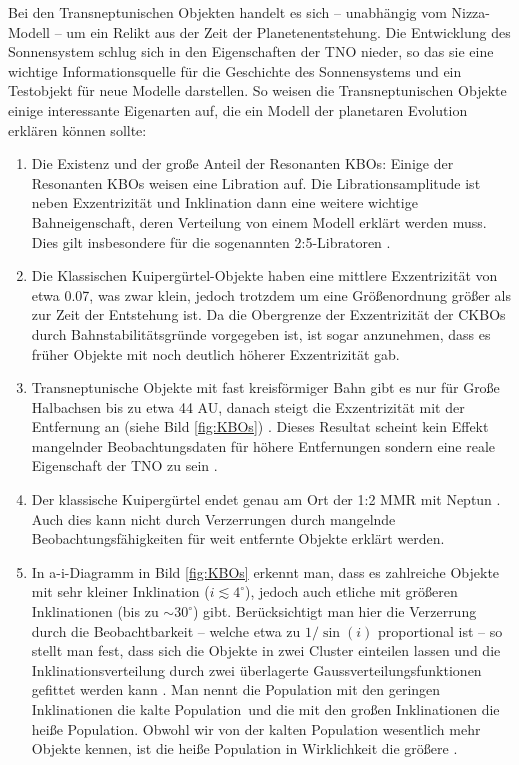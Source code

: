 \documentclass[12pt,a4paper,twoside,open=right,bibliography=totoc]{scrbook}
\renewcommand{\cite}{ \citep}
\begin{document}
\noindent
Bei den Transneptunischen Objekten handelt es sich -- unabhängig vom Nizza-Modell -- um ein Relikt aus der Zeit der Planetenentstehung. Die Entwicklung des Sonnensystem schlug sich in den Eigenschaften der TNO nieder, so das sie eine wichtige Informationsquelle für die Geschichte des Sonnensystems und ein Testobjekt für neue Modelle darstellen.
So weisen die Transneptunischen Objekte einige interessante Eigenarten auf, die ein Modell der planetaren Evolution erklären können sollte:
\begin{enumerate}
\item Die Existenz und der große Anteil der Resonanten KBOs: Einige der Resonanten KBOs weisen eine Libration auf. Die Librationsamplitude ist neben Exzentrizität und Inklination dann eine weitere wichtige Bahneigenschaft, deren Verteilung von einem Modell erklärt werden muss. Dies gilt insbesondere für die sogenannten 2:5-Libratoren\cite{Levison2008}.
\item Die Klassischen Kuipergürtel-Objekte haben eine mittlere Exzentrizität von etwa 0.07, was zwar klein, jedoch trotzdem um eine Größenordnung größer als zur Zeit der Entstehung ist. Da die Obergrenze der Exzentrizität der CKBOs durch Bahnstabilitätsgründe vorgegeben ist, ist sogar anzunehmen, dass es früher Objekte mit noch deutlich höherer Exzentrizität gab.
\item Transneptunische Objekte mit fast kreisförmiger Bahn gibt es nur für Große Halbachsen bis zu etwa 44 AU, danach steigt die Exzentrizität mit der Entfernung an (siehe Bild \ref{fig:KBOs})\cite{Levison2008}. Dieses Resultat scheint kein Effekt mangelnder Beobachtungsdaten für höhere Entfernungen sondern eine reale Eigenschaft der TNO zu sein\cite{Levison2008}.
\item Der klassische Kuipergürtel endet genau am Ort der 1:2 MMR mit Neptun\cite{Levison2008}. Auch dies kann nicht durch Verzerrungen durch mangelnde Beobachtungsfähigkeiten für weit entfernte Objekte erklärt werden.
\item In a-i-Diagramm in Bild \ref{fig:KBOs} erkennt man, dass es zahlreiche Objekte mit sehr kleiner Inklination ($i\lesssim 4^\circ$), jedoch auch etliche mit größeren Inklinationen (bis zu $\sim 30^\circ$) gibt. Berücksichtigt man hier die Verzerrung durch die Beobachtbarkeit -- welche etwa zu $1/\sin(i)$ proportional ist -- so stellt man fest, dass sich die Objekte in zwei Cluster einteilen lassen und die Inklinationsverteilung durch zwei überlagerte Gaussverteilungsfunktionen gefittet werden kann\cite{Brown2001,Levison2008}.
Man nennt die Population mit den geringen Inklinationen die \glqq kalte Population\grqq\ und die mit den großen Inklinationen die \glqq heiße Population\grqq. Obwohl wir von der kalten Population wesentlich mehr Objekte kennen, ist die heiße Population in Wirklichkeit die größere\cite{Levison2008}.

\end{enumerate}
\end{document}
